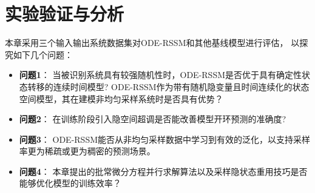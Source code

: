 \section{实验验证与分析}
\label{sec:5_experiment}
本章采用三个输入输出系统数据集对ODE-RSSM和其他基线模型进行评估，
以探究如下几个问题：
\begin{itemize}
\item \textbf{问题1}：
当被识别系统具有较强随机性时，ODE-RSSM是否优于具有确定性状态转移的连续时间模型?
ODE-RSSM作为带有随机隐变量且时间连续化的状态空间模型，其在建模非均匀采样系统时是否具有优势？
\item \textbf{问题2}：
在训练阶段引入隐空间超调是否能改善模型开环预测的准确度?
\item \textbf{问题3}： 
ODE-RSSM能否从非均匀采样数据中学习到有效的泛化，以支持采样率更为稀疏或更为稠密的预测场景。
\item \textbf{问题4}： 本章提出的批常微分方程并行求解算法以及采样隐状态重用技巧是否能够优化模型的训练效率？
\end{itemize}


